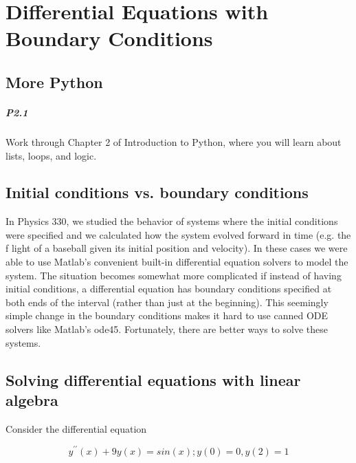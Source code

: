 	
\chapter*{Differential Equations with Boundary Conditions}
\section*{More Python}
\paragraph*{P2.1}Work through Chapter 2 of Introduction to Python, where you will learn about lists, loops, and logic.

\section*{Initial conditions vs. boundary conditions}
In Physics 330, we studied the behavior of systems where the initial conditions were specified and we calculated how the system evolved forward in time (e.g. the f light of a baseball given its initial position and velocity). In these cases we were able to use Matlab\rq s convenient built-in differential equation solvers to model the system. The situation becomes somewhat more complicated if instead of having initial conditions, a differential equation has boundary conditions specified at both ends of the interval (rather than just at the beginning). This seemingly simple change in the boundary conditions makes it hard to use canned ODE solvers like Matlab\rq s ode45. Fortunately, there are better ways to solve these systems.

\section*{Solving differential equations with linear algebra}

Consider the differential equation

\begin{equation} \label{eq:21}
	y^{\prime\prime}(x) + 9y(x) = sin(x) ; y(0) = 0, y(2) = 1
\end{equation}


